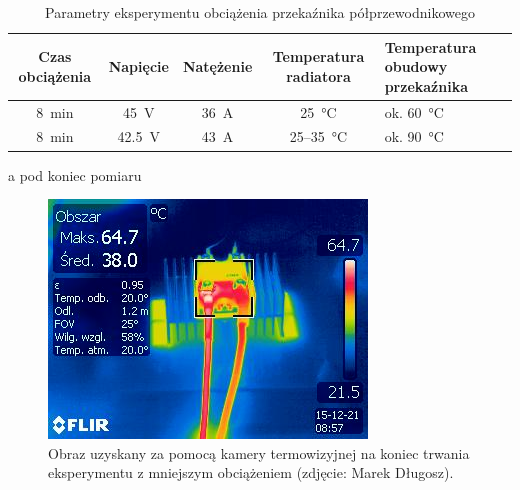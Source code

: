 \begin{table}[h]
    \centering
    
    \begin{threeparttable}
        \caption{Parametry eksperymentu obciążenia przekaźnika półprzewodnikowego}
        \label{tab:eksperyment}
        
        \begin{tabularx}{0.9\textwidth}{ccccX}
            \toprule
            Czas obciążenia & Napięcie & Natężenie & Temperatura radiatora\tnote{a} & Temperatura obudowy przekaźnika\tnote{a} \\
            \midrule
            \SI{8}{\minute} & \SI{45}{\volt} & \SI{36}{\ampere} & \SI{25}{\celsius} & ok. \SI{60}{\celsius} \\
            \SI{8}{\minute} & \SI{42.5}{\volt} & \SI{43}{\ampere} & \num{25}--\SI{35}{\celsius} & ok. \SI{90}{\celsius} \\
            \bottomrule
        \end{tabularx}
        
        \begin{tablenotes}
            \footnotesize
            \item[a] pod koniec pomiaru
        \end{tablenotes}
        
    \end{threeparttable}
\end{table}

\begin{figure}[H]
	\centering
	\includegraphics[scale=0.8]{flir/IR_5167.jpg}
	\caption{\label{fig:flir1}Obraz uzyskany za pomocą kamery termowizyjnej na koniec trwania eksperymentu z mniejszym obciążeniem (zdjęcie: Marek Długosz).}
\end{figure}

\raggedbottom

